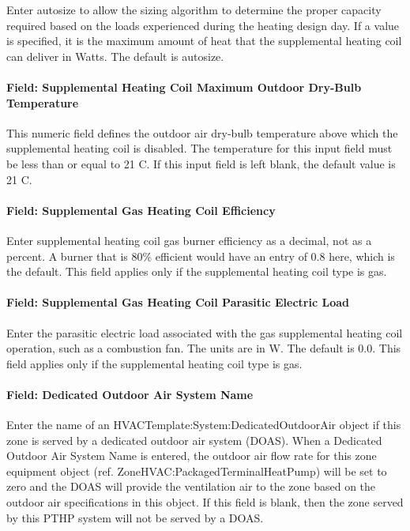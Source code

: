 Enter autosize to allow the sizing algorithm to determine the proper capacity required based on the loads experienced during the heating design day. If a value is specified, it is the maximum amount of heat that the supplemental heating coil can deliver in Watts. The default is autosize.

\paragraph{Field: Supplemental Heating Coil Maximum Outdoor Dry-Bulb Temperature}\label{field-supplemental-heating-coil-maximum-outdoor-dry-bulb-temperature}

This numeric field defines the outdoor air dry-bulb temperature above which the supplemental heating coil is disabled. The temperature for this input field must be less than or equal to 21 C. If this input field is left blank, the default value is 21 C.

\paragraph{Field: Supplemental Gas Heating Coil Efficiency}\label{field-supplemental-gas-heating-coil-efficiency}

Enter supplemental heating coil gas burner efficiency as a decimal, not as a percent. A burner that is 80\% efficient would have an entry of 0.8 here, which is the default. This field applies only if the supplemental heating coil type is gas.

\paragraph{Field: Supplemental Gas Heating Coil Parasitic Electric Load}\label{field-supplemental-gas-heating-coil-parasitic-electric-load}

Enter the parasitic electric load associated with the gas supplemental heating coil operation, such as a combustion fan. The units are in W. The default is 0.0. This field applies only if the supplemental heating coil type is gas.

\paragraph{Field: Dedicated Outdoor Air System Name}\label{field-dedicated-outdoor-air-system-name-3}

Enter the name of an HVACTemplate:System:DedicatedOutdoorAir object if this zone is served by a dedicated outdoor air system (DOAS). When a Dedicated Outdoor Air System Name is entered, the outdoor air flow rate for this zone equipment object (ref. ZoneHVAC:PackagedTerminalHeatPump) will be set to zero and the DOAS will provide the ventilation air to the zone based on the outdoor air specifications in this object. If this field is blank, then the zone served by this PTHP system will not be served by a DOAS.

